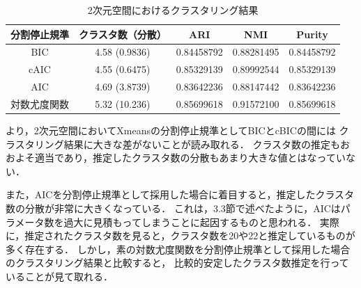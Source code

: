 \begin{table}[htb]
  \centering
  \caption{2次元空間におけるクラスタリング結果}
  \label{table:2dim}
  \begin{tabular}{|c|c|c|c|c|} \hline
    分割停止規準 & クラスタ数（分散） & ARI & NMI & Purity \\\hline
    BIC & 4.58 (0.9836) & 0.84458792 & 0.88281495 & 0.84458792\\
    cAIC & 4.55 (0.6475) & 0.85329139 & 0.89992544 & 0.85329139\\
    AIC & 4.69 (3.8739) & 0.83642236 & 0.88147442 & 0.83642236\\
    対数尤度関数 & 5.32 (10.236) & 0.85699618 & 0.91572100 & 0.85699618\\\hline 
  \end{tabular}
\end{table}

より，2次元空間においてXmeansの分割停止規準としてBICとcBICの間には
クラスタリング結果に大きな差がないことが読み取れる．
クラスタ数の推定もおおよそ適当であり，推定したクラスタ数の分散もあまり大きな値とはなっていない．

また，AICを分割停止規準として採用した場合に着目すると，推定したクラスタ数の分散が非常に大きくなっている．
これは，3.3節で述べたように，AICはパラメータ数を過大に見積もってしまうことに起因するものと思われる．
実際に，推定されたクラスタ数を見ると，クラスタ数を20や22と推定しているものが多く存在する．
しかし，素の対数尤度関数を分割停止規準として採用した場合のクラスタリング結果と比較すると，
比較的安定したクラスタ数推定を行っていることが見て取れる．

